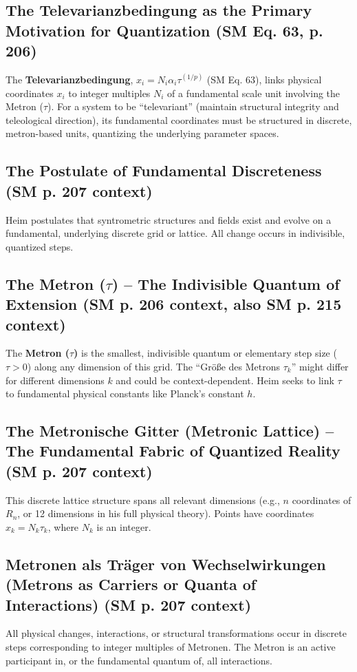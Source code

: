 \documentclass[
    12pt,              %
    a4paper,           %
    headings=normal,   %
    twoside=true,      %
    BCOR=8mm,          %
]{scrbook}
\newcommand{\q}[1]{\enquote{#1}}
\newcommand{\semantischermetrophor}{R_n}
\newcommand{\metron}{\tau}
\begin{document}
\subsection{The Televarianzbedingung as the Primary Motivation for Quantization (SM Eq. 63, p. 206)}
\label{sec:ch10_1_1_televarianzbedingung}
The \textbf{Televarianzbedingung}, \(x_i = N_i \alpha_i \tau^{(1/p)}\) (SM Eq. 63), links physical coordinates \(x_i\) to integer multiples \(N_i\) of a fundamental scale unit involving the Metron (\(\metron\)). For a system to be \q{televariant} (maintain structural integrity and teleological direction), its fundamental coordinates must be structured in discrete, metron-based units, quantizing the underlying parameter spaces.

\subsection{The Postulate of Fundamental Discreteness (SM p. 207 context)}
\label{sec:ch10_1_2_postulate_discreteness}
Heim postulates that syntrometric structures and fields exist and evolve on a fundamental, underlying discrete grid or lattice. All change occurs in indivisible, quantized steps.

\subsection{The Metron (\(\metron\)) – The Indivisible Quantum of Extension (SM p. 206 context, also SM p. 215 context)}
\label{sec:ch10_1_3_metron}
The \textbf{Metron (\(\metron\))} is the smallest, indivisible quantum or elementary step size (\(\metron > 0\)) along any dimension of this grid. The \q{Größe des Metrons \(\tau_k\)} might differ for different dimensions \(k\) and could be context-dependent. Heim seeks to link \(\metron\) to fundamental physical constants like Planck's constant \(h\).

\subsection{The Metronische Gitter (Metronic Lattice) – The Fundamental Fabric of Quantized Reality (SM p. 207 context)}
\label{sec:ch10_1_4_metronische_gitter}
This discrete lattice structure spans all relevant dimensions (e.g., \(n\) coordinates of \(\semantischermetrophor\), or 12 dimensions in his full physical theory). Points have coordinates \(x_k = N_k \tau_k\), where \(N_k\) is an integer.

\subsection{Metronen als Träger von Wechselwirkungen (Metrons as Carriers or Quanta of Interactions) (SM p. 207 context)}
\label{sec:ch10_1_5_metronen_traeger}
All physical changes, interactions, or structural transformations occur in discrete steps corresponding to integer multiples of Metronen. The Metron is an active participant in, or the fundamental quantum of, all interactions.
\end{document}
